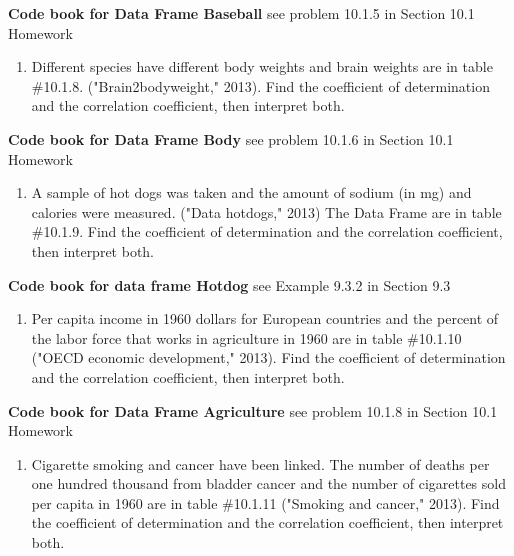 \documentclass[
]{book}
\providecommand{\tightlist}{%
  \setlength{\itemsep}{0pt}\setlength{\parskip}{0pt}}
\begin{document}
\textbf{Code book for Data Frame Baseball} see problem 10.1.5 in Section 10.1 Homework

\begin{enumerate}
\def\labelenumi{\arabic{enumi}.}
\setcounter{enumi}{5}
\tightlist
\item
  Different species have different body weights and brain weights are in table \#10.1.8. ("Brain2bodyweight," 2013). Find the coefficient of determination and the correlation coefficient, then interpret both.
\end{enumerate}

\textbf{Code book for Data Frame Body} see problem 10.1.6 in Section 10.1 Homework

\begin{enumerate}
\def\labelenumi{\arabic{enumi}.}
\setcounter{enumi}{6}
\tightlist
\item
  A sample of hot dogs was taken and the amount of sodium (in mg) and calories were measured. ("Data hotdogs," 2013) The Data Frame are in table \#10.1.9. Find the coefficient of determination and the correlation coefficient, then interpret both.
\end{enumerate}

\textbf{Code book for data frame Hotdog} see Example 9.3.2 in Section 9.3

\begin{enumerate}
\def\labelenumi{\arabic{enumi}.}
\setcounter{enumi}{7}
\tightlist
\item
  Per capita income in 1960 dollars for European countries and the percent of the labor force that works in agriculture in 1960 are in table \#10.1.10 ("OECD economic development," 2013). Find the coefficient of determination and the correlation coefficient, then interpret both.
\end{enumerate}

\textbf{Code book for Data Frame Agriculture} see problem 10.1.8 in Section 10.1 Homework

\begin{enumerate}
\def\labelenumi{\arabic{enumi}.}
\setcounter{enumi}{8}
\tightlist
\item
  Cigarette smoking and cancer have been linked. The number of deaths per one hundred thousand from bladder cancer and the number of cigarettes sold per capita in 1960 are in table \#10.1.11 ("Smoking and cancer," 2013). Find the coefficient of determination and the correlation coefficient, then interpret both.
\end{enumerate}
\end{document}
